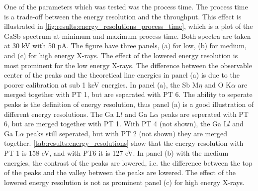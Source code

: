 One of the parameters which was tested was the process time.
The process time is a trade-off between the energy resolution and the throughput.
This effect is illustrated in \cref{fig:results:energy_resolutions_process_time}, which is a plot of the GaSb spectrum at minimum and maximum process time.
Both spectra are taken at 30 kV with 50 pA.
The figure have three panels, (a) for low, (b) for medium, and (c) for high energy X-rays.
The effect of the lowered energy resolution is most prominent for the low energy X-rays.
The difference between the observable center of the peaks and the theoretical line energies in panel (a) is due to the poorer calibration at sub 1 keV energies.
In panel (a), the Sb M$\eta$ and O K$\alpha$ are merged together with PT 1, but are separated with PT 6.
The ability to seperate peaks is the definition of energy resolution, thus panel (a) is a good illustration of different energy resolutions.
The Ga L$l$ and Ga L$\alpha$ peaks are seperated with PT 6, but are merged together with PT 1.
With PT 4 (not shown), the Ga L$l$ and Ga L$\alpha$ peaks still seperated, but with PT 2 (not shown) they are merged together.
\cref{tab:results:energy_resolutions} show that the energy resolution with PT 1 is 158 eV, and with PT6 it is 127 eV.
In panel (b) with the medium energies, the contrast of the peaks are lowered, i.e. the difference between the top of the peaks and the valley between the peaks are lowered.
The effect of the lowered energy resolution is not as prominent panel (c) for high energy X-rays.



